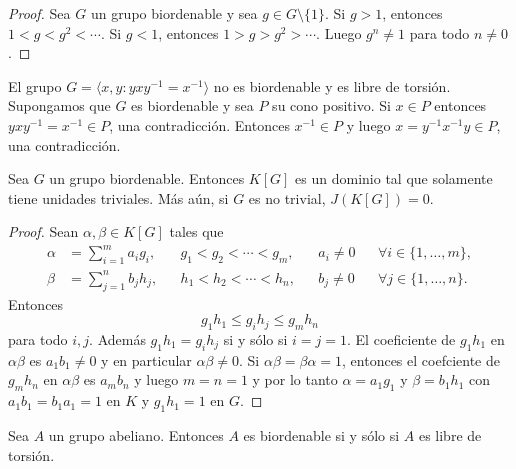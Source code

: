 \begin{proof}
	Sea $G$ un grupo biordenable y sea $g\in G\setminus\{1\}$. 
	Si $g>1$, entonces 
	$1<g<g^2<\cdots$. Si $g<1$, entonces $1>g>g^2>\cdots$. Luego $g^n\ne 1$ para todo $n\ne 0$. 
\end{proof}

\begin{example}
	El grupo $G=\langle x,y:yxy^{-1}=x^{-1}\rangle$ no es biordenable y es libre de torsión. 
	Supongamos que $G$ es biordenable y sea $P$ su cono positivo. Si $x\in P$
	entonces $yxy^{-1}=x^{-1}\in P$, una contradicción. Entonces $x^{-1}\in P$
	y luego $x=y^{-1}x^{-1}y\in P$, una contradicción.
\end{example}

\begin{theorem}
	\label{thm:BO}
	Sea $G$ un grupo biordenable. Entonces $K[G]$ es un dominio tal que
	solamente tiene unidades triviales. Más aún, si $G$ es no trivial,
	$J(K[G])=0$. 
\end{theorem}

\begin{proof}
	Sean $\alpha,\beta\in K[G]$ tales que 
	\begin{align*}
		\alpha&=\sum_{i=1}^m a_ig_i, && g_1<g_2<\cdots<g_m,&& a_i\ne 0 && \forall i\in\{1,\dots,m\},\\
		\beta&=\sum_{j=1}^n b_jh_j, && h_1<h_2<\cdots<h_n, && b_j\ne 0 && \forall j\in\{1,\dots,n\}.
	\end{align*}
	Entonces 
	\[
		g_1h_1\leq g_ih_j\leq g_mh_n
	\]
	para todo $i,j$. Además $g_1h_1=g_ih_j$ si y sólo si $i=j=1$. El
	coeficiente de $g_1h_1$ en $\alpha\beta$ es $a_1b_1\ne 0$ y en particular
	$\alpha\beta\ne0$. Si $\alpha\beta=\beta\alpha=1$, entonces el coefciente
	de $g_mh_n$ en $\alpha\beta$ es $a_mb_n$ y luego $m=n=1$ y por lo tanto
	$\alpha=a_1g_1$ y $\beta=b_1h_1$ con $a_1b_1=b_1a_1=1$ en $K$ y $g_1h_1=1$
	en $G$.
\end{proof}

\begin{theorem}[Levi]
	\label{thm:Levi}
	Sea $A$ un grupo abeliano. Entonces $A$ es biordenable si y sólo si $A$ es
	libre de torsión.
\end{theorem}

